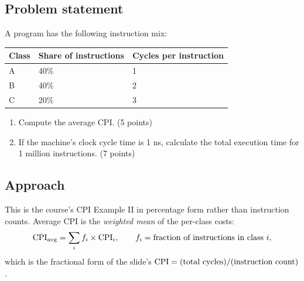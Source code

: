 





\subsection*{Problem statement}

A program has the following instruction mix:

\begin{center}
\begin{tabular}{lll}
  \toprule
  Class & Share of instructions & Cycles per instruction \\
  \midrule
  A & 40\% & 1 \\
  B & 40\% & 2 \\
  C & 20\% & 3 \\
  \bottomrule
\end{tabular}
\end{center}

\begin{enumerate}[label=(\alph*)]
  \item Compute the average CPI. \hfill (5 points)
  \item If the machine's clock cycle time is 1 ns, calculate the total execution
    time for 1 million instructions. \hfill (7 points)
\end{enumerate}

\subsection*{Approach}

This is the course's CPI Example II  in percentage form rather than instruction counts. Average CPI is the
\emph{weighted mean} of the per-class costs:
\begin{equation}
  \mathrm{CPI}_{\text{avg}} = \sum_{i} f_i \times \mathrm{CPI}_i,
  \qquad f_i = \text{fraction of instructions in class } i,
  \label{eq:cpiavg}
\end{equation}
which is the fractional form of the slide's
$\mathrm{CPI} = (\text{total cycles})/(\text{instruction count})$.

